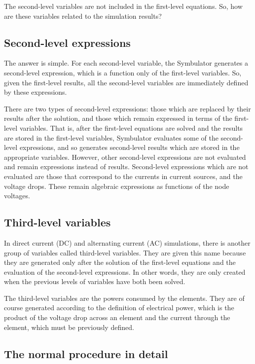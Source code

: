 The second-level variables are not included in the first-level
equations. So, how are these variables related to the simulation
results?

\subsection{Second-level expressions}

The answer is simple. For each second-level variable, the Symbulator
generates a second-level expression, which is a function only of the
first-level variables. So, given the first-level results, all the
second-level variables are immediately defined by these expressions.

There are two types of second-level expressions: those which are
replaced by their results after the solution, and those which remain
expressed in terms of the first-level variables. That is, after the
first-level equations are solved and the results are stored in the
first-level variables, Symbulator evaluates some of the second-level
expressions, and so generates second-level results which are stored
in the appropriate variables. However, other second-level
expressions are not evaluated and remain expressions instead of
results. Second-level expressions which are not evaluated are those
that correspond to the currents in current sources, and the voltage
drops. These remain algebraic expressions as functions of the node
voltages.

\subsection{Third-level variables}

In direct current (DC) and alternating current (AC) simulations,
there is another group of variables called third-level variables.
They are given this name because they are generated only after the
solution of the first-level equations and the evaluation of the
second-level expressions. In other words, they are only created when
the previous levels of variables have both been solved.

The third-level variables are the powers consumed by the elements.
They are of course generated according to the definition of
electrical power, which is the product of the voltage drop across an
element and the current through the element, which must be
previously defined.

\subsection{The normal procedure in detail}

